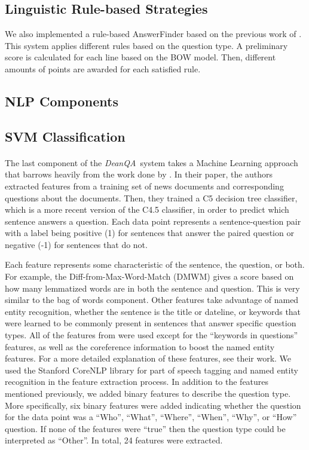 \documentclass[11pt,letterpaper]{article}
\newcommand{\name}{\emph{DeanQA~}}
\begin{document}
\subsection{Linguistic Rule-based Strategies}

We also implemented a rule-based AnswerFinder based on the previous
work of \cite{riloff2000}. This system applies different rules based
on the question type. A preliminary score is calculated for each line
based on the BOW model. Then, different amounts of points are awarded
for each satisfied rule.

\subsection{NLP Components}


\subsection{SVM Classification}
\paragraph{}
The last component of the \name system takes a Machine Learning approach that barrows heavily 
from the work done by \cite{Ng00amachine}.  In their paper, the authors extracted features from a training
set of news documents and corresponding questions about the documents.  Then, they trained a C5 
decision tree classifier, which is a more recent version of the C4.5  \cite{Quinlan:1993:CPM:152181} classifier, 
in order to predict which sentence answers a question.  Each data point represents a sentence-question pair with a 
label being positive (1) for sentences that answer the paired question or negative (-1) 
for sentences that do not.

Each feature represents some characteristic of the sentence, the question, or both.  
For example, the Diff-from-Max-Word-Match (DMWM) gives a score based on how many lemmatized 
words are in both the sentence and question.  This is very similar to the bag of words component. 
 Other features take advantage of named entity recognition, whether the sentence is the title or dateline, 
or keywords that were learned to be commonly present in sentences that answer specific question types. 
 All of the features from \cite{Ng00amachine} were used except for the ``keywords in questions'' features,
 as well as the coreference information to boost the named entity features.  For a more detailed explanation 
 of these features, see their work.  We used the Stanford CoreNLP library for part of speech tagging 
 \cite{Toutanova00enrichingthe} and named entity recognition \cite{Finkel05incorporatingnon-local} in the feature extraction
 process.  In addition to the features mentioned previously, we added binary features 
 to describe the question type.  More specifically, six binary features were added indicating whether the question 
 for the data point was a ``Who'', ``What'', ``Where'', ``When'', ``Why'', or ``How'' question.  If none of 
 the features were ``true'' then the question type could be interpreted as ``Other''.   In total, 24 features 
 were extracted.
\end{document}
